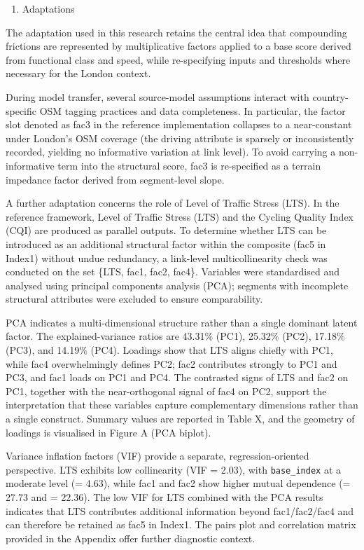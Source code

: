 \documentclass[
  12pt,
  oneside]{book}
\providecommand{\tightlist}{%
  \setlength{\itemsep}{0pt}\setlength{\parskip}{0pt}}
\begin{document}
\begin{enumerate}
\def\labelenumi{\arabic{enumi}.}
\setcounter{enumi}{1}
\tightlist
\item
  Adaptations
\end{enumerate}

The adaptation used in this research retains the central idea that compounding frictions are represented by multiplicative factors applied to a base score derived from functional class and speed, while re-specifying inputs and thresholds where necessary for the London context.

During model transfer, several source-model assumptions interact with country-specific OSM tagging practices and data completeness. In particular, the factor slot denoted as fac3 in the reference implementation collapses to a near-constant under London's OSM coverage (the driving attribute is sparsely or inconsistently recorded, yielding no informative variation at link level). To avoid carrying a non-informative term into the structural score, fac3 is re-specified as a terrain impedance factor derived from segment-level slope.

A further adaptation concerns the role of Level of Traffic Stress (LTS). In the reference framework, Level of Traffic Stress (LTS) and the Cycling Quality Index (CQI) are produced as parallel outputs. To determine whether LTS can be introduced as an additional structural factor within the composite (fac5 in Index1) without undue redundancy, a link-level multicollinearity check was conducted on the set \{LTS, fac1, fac2, fac4\}. Variables were standardised and analysed using principal components analysis (PCA); segments with incomplete structural attributes were excluded to ensure comparability.

PCA indicates a multi-dimensional structure rather than a single dominant latent factor. The explained-variance ratios are 43.31\% (PC1), 25.32\% (PC2), 17.18\% (PC3), and 14.19\% (PC4). Loadings show that LTS aligns chiefly with PC1, while fac4 overwhelmingly defines PC2; fac2 contributes strongly to PC1 and PC3, and fac1 loads on PC1 and PC4. The contrasted signs of LTS and fac2 on PC1, together with the near-orthogonal signal of fac4 on PC2, support the interpretation that these variables capture complementary dimensions rather than a single construct. Summary values are reported in Table X, and the geometry of loadings is visualised in Figure A (PCA biplot).

Variance inflation factors (VIF) provide a separate, regression-oriented perspective. LTS exhibits low collinearity (VIF = 2.03), with \texttt{base\_index} at a moderate level (= 4.63), while fac1 and fac2 show higher mutual dependence (= 27.73 and = 22.36). The low VIF for LTS combined with the PCA results indicates that LTS contributes additional information beyond fac1/fac2/fac4 and can therefore be retained as fac5 in Index1. The pairs plot and correlation matrix provided in the Appendix offer further diagnostic context.
\end{document}
